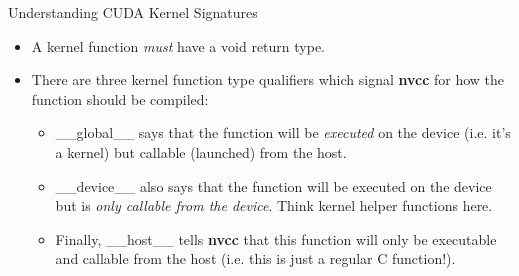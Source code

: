\documentclass[handout]{beamer}
\begin{document}
%

\begin{frame}{Understanding CUDA Kernel Signatures}
\begin{itemize}
\itemsep1em
	\item<1->A kernel function \emph{must} have a {\selectfont void} return type.
	\item<1-> There are three kernel function type qualifiers which signal \textbf{{\selectfont nvcc}} for how the function should be compiled:
	\begin{itemize}
	\itemsep1em
		\item<1->{\selectfont \_\_global\_\_} says that the function will be \emph{executed} on the device (i.e. it's a kernel) but callable (launched) from the host.
		\item<1->{\selectfont \_\_device\_\_} also says that the function will be executed on the device but is \emph{only callable from the device}.  Think kernel helper functions here.
		\item<1->Finally, {\selectfont \_\_host\_\_} tells \textbf{{\selectfont nvcc}} that this function will only be executable and callable from the host (i.e. this is just a regular C function!).
	\end{itemize}
\end{itemize}
\end{frame}
\end{document}
